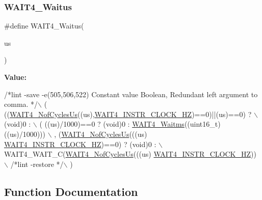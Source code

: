 \mbox{\label{group___w_a_i_t4__module_gaa850ebbcb5371047081f0082cef8cab8}} 
\subsubsection{\texorpdfstring{W\+A\+I\+T4\+\_\+\+Waitus}{WAIT4\_Waitus}}
{\footnotesize\ttfamily \#define W\+A\+I\+T4\+\_\+\+Waitus(\begin{DoxyParamCaption}\item[{}]{us }\end{DoxyParamCaption})}

{\bfseries Value\+:}
\begin{DoxyCode}
\textcolor{comment}{/*lint -save -e(505,506,522) Constant value Boolean, Redundant left argument to comma. */}\(\backslash\)
       (  ((\hyperlink{group___w_a_i_t4__module_ga1301be60637fa5a05e0a9635ce6c1f5a}{WAIT4\_NofCyclesUs}((us),\hyperlink{group___w_a_i_t4__module_ga79cc0104fa58e3905dda648c3be49cea}{WAIT4\_INSTR\_CLOCK\_HZ})==0)||(us)==0)
       ? \(\backslash\)
          (\textcolor{keywordtype}{void})0 : \(\backslash\)
          ( ((us)/1000)==0 ? (void)0 : \hyperlink{group___w_a_i_t4__module_ga7a6804df6ef7344cfbea6873e0b574aa}{WAIT4\_Waitms}((uint16\_t)((us)/1000))) \(\backslash\)
          , (\hyperlink{group___w_a_i_t4__module_ga1301be60637fa5a05e0a9635ce6c1f5a}{WAIT4\_NofCyclesUs}(((us)%
      \hyperlink{group___w_a_i_t4__module_ga79cc0104fa58e3905dda648c3be49cea}{WAIT4\_INSTR\_CLOCK\_HZ})==0) ? (\textcolor{keywordtype}{void})0 : \(\backslash\)
            WAIT4\_WAIT\_C(\hyperlink{group___w_a_i_t4__module_ga1301be60637fa5a05e0a9635ce6c1f5a}{WAIT4\_NofCyclesUs}(((us)%
      \hyperlink{group___w_a_i_t4__module_ga79cc0104fa58e3905dda648c3be49cea}{WAIT4\_INSTR\_CLOCK\_HZ})) \(\backslash\)
       \textcolor{comment}{/*lint -restore */}\(\backslash\)
       )
\end{DoxyCode}


\subsection{Function Documentation}
\mbox{\label{group___w_a_i_t4__module_ga0d401ca6ca297b5b7a450deed0c42b78}} 
